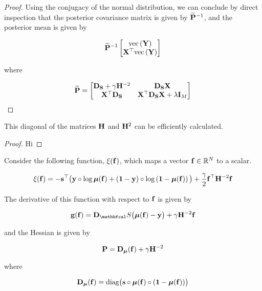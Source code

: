 \begin{proof}
    Using the conjugacy of the normal distribution, we can conclude by direct inspection that the posterior covariance matrix is given by $\widetilde{\mathbf{P}}^{-1}$, and the posterior mean is given by 

    $$
    \widetilde{\mathbf{P}}^{-1} \begin{bmatrix} \text{\textup{vec}}\left(\mathbf{Y}\right) \\ \mathbf{X}^\top \text{\textup{vec}}\left(\mathbf{Y}\right) \end{bmatrix}
    $$

    where 

    $$
    \widetilde{\mathbf{P}} = \begin{bmatrix}
        \mathbf{D}_{\mathbf{S}} + \gamma \mathbf{H}^{-2} & \mathbf{D}_{\mathbf{S}}  \mathbf{X} \\
        \mathbf{X}^\top \mathbf{D}_{\mathbf{S}} & \mathbf{X}^\top \mathbf{D}_{\mathbf{S}} \mathbf{X} + \lambda \mathbf{I}_M   
       \end{bmatrix}
    $$

\end{proof}


\begin{theorem}
    \label{the:efficient_H_diag}

    This diagonal of the matrices $\mathbf{H}$ and $\mathbf{H}^2$ can be efficiently calculated. 
\end{theorem}

\begin{proof}
    Hi 
\end{proof}


\begin{theorem}
    \label{the:gradient_and_hesian}

    Consider the following function, $\xi(\mathbf{f})$, which maps a vector $\mathbf{f} \in \mathbb{R}^N$ to a scalar. 

    \begin{equation}
        \xi(\mathbf{f}) = -\mathbf{s}^\top \big(\mathbf{y} \circ \log \boldsymbol{\mu}(\mathbf{f}) + \left(\mathbf{1}  - \mathbf{y}\right) \circ \log \left(\mathbf{1} - \boldsymbol{\mu}(\mathbf{f}) \right)\big) + \frac{\gamma}{2} \mathbf{f}^\top \mathbf{H}^{-2} \mathbf{f}
    \end{equation}

    The derivative of this function with respect to $\mathbf{f}$ is given by 

    \begin{equation}
        \g(\f) = \D_\St \big(\muu(\f) - \y\big) + \gamma \HH^{-2} \f
    \end{equation}

    and the Hessian is given by 

    \begin{equation}
        \mathbf{P}  =  \mathbf{D}_{\boldsymbol{\mu}}(\mathbf{f}) + \gamma \mathbf{H}^{-2}
    \end{equation}

    where 

    \begin{equation*}
        \mathbf{D}_{\boldsymbol{\mu}}(\mathbf{f}) = \textup{diag}\big(\mathbf{s} \circ \boldsymbol{\mu}(\mathbf{f}) \circ (\mathbf{1} - \boldsymbol{\mu}(\mathbf{f}))\big)
    \end{equation*}

\end{theorem}

